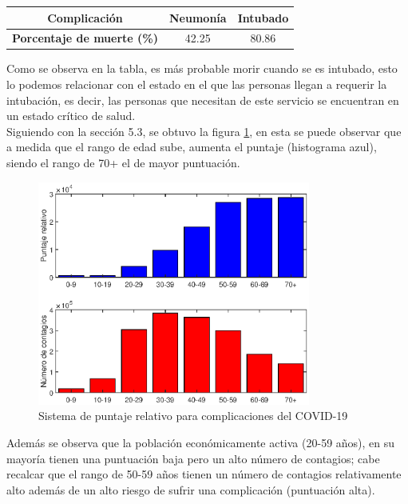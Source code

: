 \documentclass[12pt,a4paper]{article}
\begin{document}
\begin{center}
    \begin{tabular}{|c|c|c|}
\hline
\rowcolor[HTML]{C0C0C0} 
\textbf{Complicación}                                      & Neumonía & Intubado \\ \hline
\cellcolor[HTML]{C0C0C0}\textbf{Porcentaje de muerte (\%)} & 42.25    & 80.86    \\ \hline
\end{tabular} 
\end{center}
Como se observa en la tabla, es más probable morir cuando se es intubado, esto lo podemos relacionar con el estado en el que las personas llegan a requerir la intubación, es decir, las personas que necesitan de este servicio se encuentran en un estado crítico de salud.\\
Siguiendo con la sección 5.3, se obtuvo la figura \ref{Figura3}, en esta se puede observar que a medida que el rango de edad sube, aumenta el puntaje (histograma azul), siendo el rango de 70+ el de mayor puntuación. 

\begin{figure}
\centering
\includegraphics[width = 0.8\textwidth]{Figura3.eps}
\caption{Sistema de puntaje relativo para complicaciones del COVID-19}  
\label{Figura3}
\end{figure}

Además se observa que la población económicamente activa (20-59 años), en su mayoría tienen una puntuación baja pero un alto número de contagios; cabe recalcar que el rango de 50-59 años tienen un número de contagios relativamente alto además de un alto riesgo de sufrir una complicación (puntuación alta). 
\setlength{\parindent}{1cm}
\end{document}
